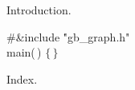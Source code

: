 


\datethis


Introduction.

\Y\B\8\#\&{include} \.{"gb\_graph.h"}\6
\ATH\7
\\{main}(\,)\1\1\2\2\6
${}\{\,\}{}$\par
\fi

Index.
\fi

\inx
\fin
\con
